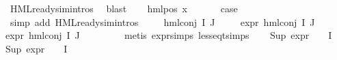 \begin{isabellebody}
\ HML{\isacharunderscore}{\kern0pt}ready{\isacharunderscore}{\kern0pt}sim{\isachardot}{\kern0pt}intros{\isacharparenleft}{\kern0pt}{}{\isacharparenright}{\kern0pt}\ \isamarkupfalse%
\ blast\isanewline
{}\isamarkupfalse%
\isanewline
\ \ \isamarkupfalse%
\ {\isacharparenleft}{\kern0pt}hml{\isacharunderscore}{\kern0pt}pos\ x{}\ {\isasymphi}{\isacharparenright}{\kern0pt}\isanewline
\ \ \isamarkupfalse%
\ \isamarkupfalse%
\ {\isacharquery}{\kern0pt}case\ \isanewline
\ \ \ \ \isamarkupfalse%
\ {\isacharparenleft}{\kern0pt}simp\ add{\isacharcolon}{\kern0pt}\ HML{\isacharunderscore}{\kern0pt}ready{\isacharunderscore}{\kern0pt}sim{\isachardot}{\kern0pt}intros{\isacharparenleft}{\kern0pt}{}{\isacharparenright}{\kern0pt}{\isacharparenright}{\kern0pt}\ \isanewline
{}\isamarkupfalse%
\isanewline
\ \ \isamarkupfalse%
\ {\isacharparenleft}{\kern0pt}hml{\isacharunderscore}{\kern0pt}conj\ I\ J\ {\isasymPhi}{\isacharparenright}{\kern0pt}\isanewline
\ \ \isamarkupfalse%
\ {\isachardoublequoteopen}expr{\isacharunderscore}{\kern0pt}{}\ {\isacharparenleft}{\kern0pt}hml{\isacharunderscore}{\kern0pt}conj\ I\ J\ {\isasymPhi}{\isacharparenright}{\kern0pt}\ {\isasymle}\ {}{\isachardoublequoteclose}\isanewline
{\isachardoublequoteopen}expr{\isacharunderscore}{\kern0pt}{}\ {\isacharparenleft}{\kern0pt}hml{\isacharunderscore}{\kern0pt}conj\ I\ J\ {\isasymPhi}{\isacharparenright}{\kern0pt}\ {\isasymle}\ {}{\isachardoublequoteclose}\isanewline
\ \ \ \ \isamarkupfalse%
\ {\isacharparenleft}{\kern0pt}metis\ expr{\isachardot}{\kern0pt}simps\ less{\isacharunderscore}{\kern0pt}eq{\isacharunderscore}{\kern0pt}t{\isachardot}{\kern0pt}simps{\isacharparenright}{\kern0pt}{\isacharplus}{\kern0pt}\isanewline
\ \ \isamarkupfalse%
\ {\isachardoublequoteopen}Sup\ {\isacharparenleft}{\kern0pt}{\isacharparenleft}{\kern0pt}expr{\isacharunderscore}{\kern0pt}{}\ {\isasymcirc}\ {\isasymPhi}{\isacharparenright}{\kern0pt}\ {\isacharbackquote}{\kern0pt}\ I{\isacharparenright}{\kern0pt}\ {\isasymle}\ {}{\isachardoublequoteclose}\isanewline
{\isachardoublequoteopen}Sup\ {\isacharparenleft}{\kern0pt}{\isacharparenleft}{\kern0pt}expr{\isacharunderscore}{\kern0pt}{}\ {\isasymcirc}\ {\isasymPhi}{\isacharparenright}{\kern0pt}\ {\isacharbackquote}{\kern0pt}\ I{\isacharparenright}{\kern0pt}\ {\isasymle}\ {}{\isachardoublequoteclose}\isanewline

\end{isabellebody}
